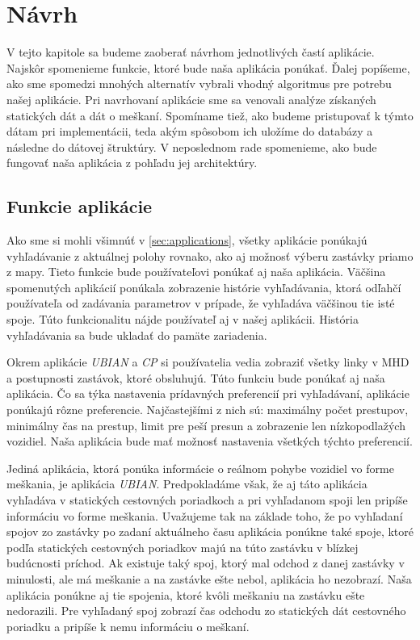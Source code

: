 \chapter{Návrh}
\label{kap:nav}
V tejto kapitole sa budeme zaoberať návrhom jednotlivých častí aplikácie. Najskôr spomenieme funkcie, ktoré bude naša aplikácia ponúkať. Ďalej popíšeme, ako sme spomedzi mnohých alternatív vybrali vhodný algoritmus pre potrebu našej aplikácie. Pri navrhovaní aplikácie sme sa venovali analýze získaných statických dát a dát o meškaní. Spomíname tiež, ako budeme pristupovať k týmto dátam pri implementácii, teda akým spôsobom ich uložíme do databázy a následne do dátovej štruktúry. V neposlednom rade spomenieme, ako bude fungovať naša aplikácia z pohľadu jej architektúry.

\section{Funkcie aplikácie}
Ako sme si mohli všimnúť v \ref{sec:applications}, všetky aplikácie ponúkajú vyhľadávanie z aktuálnej polohy rovnako, ako aj možnosť výberu zastávky priamo z mapy. Tieto funkcie bude používateľovi ponúkať aj naša aplikácia. Väčšina spomenutých aplikácií ponúkala zobrazenie histórie vyhľadávania, ktorá odľahčí používateľa od zadávania parametrov v prípade, že vyhľadáva väčšinou tie isté spoje. Túto funkcionalitu nájde používateľ aj v našej aplikácii. História vyhľadávania sa bude ukladať do pamäte zariadenia. 

Okrem aplikácie \textit{UBIAN} a \textit{CP} si používatelia vedia zobraziť všetky linky v MHD a postupnosti zastávok, ktoré obsluhujú. Túto funkciu bude ponúkať aj naša aplikácia. Čo sa týka nastavenia prídavných preferencií pri vyhľadávaní, aplikácie ponúkajú rôzne preferencie. Najčastejšími z nich sú: maximálny počet prestupov, minimálny čas na prestup, limit pre peší presun a zobrazenie len nízkopodlažých vozidiel. Naša aplikácia bude mať možnosť nastavenia všetkých týchto preferencií.

Jediná aplikácia, ktorá ponúka informácie o reálnom pohybe vozidiel vo forme meškania, je aplikácia \textit{UBIAN}. Predpokladáme však, že aj táto aplikácia vyhľadáva v statických cestovných poriadkoch a pri vyhľadanom spoji len pripíše informáciu vo forme meškania. Uvažujeme tak na základe toho, že po vyhľadaní spojov zo zastávky po zadaní aktuálneho času aplikácia ponúkne také spoje, ktoré podľa statických cestovných poriadkov majú na túto zastávku v blízkej budúcnosti príchod. Ak existuje taký spoj, ktorý mal odchod z danej zastávky v minulosti, ale má meškanie a na zastávke ešte nebol, aplikácia ho nezobrazí. Naša aplikácia ponúkne aj tie spojenia, ktoré kvôli meškaniu na zastávku ešte nedorazili. Pre vyhľadaný spoj zobrazí čas odchodu zo statických dát cestovného poriadku a pripíše k nemu informáciu o meškaní.

